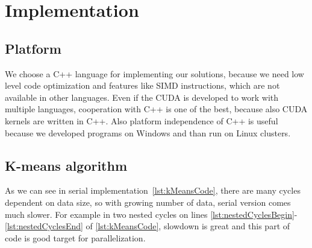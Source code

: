 \chapter{Implementation}
\section{Platform}
We choose a C++ language for implementing our solutions, because we need low level code optimization and features like SIMD instructions, which are not available in other languages. Even if the CUDA is developed to work with multiple languages, cooperation with  C++ is one of the best, because also CUDA kernels are written in C++. Also platform independence of C++ is useful because we developed programs on Windows and than run on Linux clusters.

\section{K-means algorithm} \label{sec:kMeansAlgorithm}

As we can see in serial implementation~\autoref{lst:kMeansCode}, there are many cycles dependent on data size, so with growing number of data, serial version comes much slower. For example in two nested cycles on lines \autoref{lst:nestedCyclesBegin}-\autoref{lst:nestedCyclesEnd} of \autoref{lst:kMeansCode}, slowdown is great and this part of code is good target for parallelization.\\

